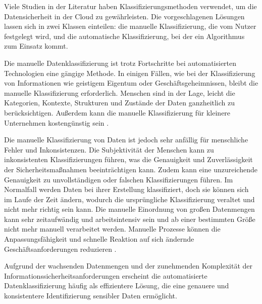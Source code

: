 Viele Studien in der Literatur haben Klassifizierungsmethoden verwendet, um die Datensicherheit in der Cloud zu gewährleisten. Die vorgeschlagenen Lösungen lassen sich in zwei Klassen einteilen: die manuelle Klassifizierung, die vom Nutzer festgelegt wird, und die automatische Klassifizierung, bei der ein Algorithmus zum Einsatz kommt.

Die manuelle Datenklassifizierung ist trotz Fortschritte bei automatisierten Technologien eine gängige Methode. In einigen Fällen, wie bei der Klassifizierung von Informationen wie geistigem Eigentum oder Geschäftsgeheimnissen, bleibt die manuelle Klassifizierung erforderlich. Menschen sind in der Lage, leicht die Kategorien, Kontexte, Strukturen und Zustände der Daten ganzheitlich zu berücksichtigen. Außerdem kann die manuelle Klassifizierung für kleinere Unternehmen kostengünstig sein \cite{Divadari.2023}\cite{Alsuwaie.2021}.

Die manuelle Klassifizierung von Daten ist jedoch sehr anfällig für menschliche Fehler und Inkonsistenzen. Die Subjektivität der Menschen kann zu inkonsistenten Klassifizierungen führen, was die Genauigkeit und Zuverlässigkeit der Sicherheitsmaßnahmen beeinträchtigen kann. Zudem kann eine unzureichende Genauigkeit zu unvollständigen oder falschen Klassifizierungen führen. Im Normalfall werden Daten bei ihrer Erstellung klassifiziert, doch sie können sich im Laufe der Zeit ändern, wodurch die ursprüngliche Klassifizierung veraltet und nicht mehr richtig sein kann. Die manuelle Einordnung von großen Datenmengen kann sehr zeitaufwändig und arbeitsintensiv sein und ab einer bestimmten Größe nicht mehr manuell verarbeitet werden. Manuelle Prozesse können die Anpassungsfähigkeit und schnelle Reaktion auf sich ändernde Geschäftsanforderungen reduzieren \cite{Venhorst.2019}.

Aufgrund der wachsenden Datenmengen und der zunehmenden Komplexität der Informationssicherheitsanforderungen erscheint die automatisierte Datenklassifizierung häufig als effizientere Lösung, die eine genauere und konsistentere Identifizierung sensibler Daten ermöglicht.

